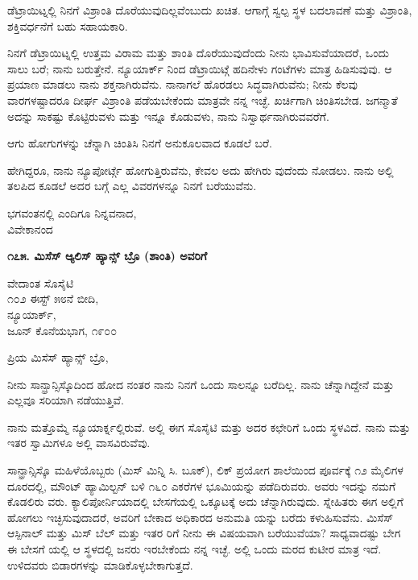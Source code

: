 ಡೆಟ್ರಾಯಿಟ್ನಲ್ಲಿ ನಿನಗೆ ವಿಶ್ರಾಂತಿ ದೊರೆಯುವುದಿಲ್ಲವೆಂಬುದು ಖಚಿತ. ಆಗಾಗ್ಗೆ ಸ್ವಲ್ಪ ಸ್ಥಳ ಬದಲಾವಣೆ ಮತ್ತು ವಿಶ್ರಾಂತಿ, ಶಕ್ತಿವರ್ಧನೆಗೆ ಬಹು ಸಹಾಯಕಾರಿ.

ನಿನಗೆ ಡೆಟ್ರಾಯಿಟ್ನಲ್ಲಿ ಉತ್ತಮ ವಿರಾಮ ಮತ್ತು ಶಾಂತಿ ದೊರೆಯುವುದೆಂದು ನೀನು ಭಾವಿಸುವೆಯಾದರೆ, ಒಂದು ಸಾಲು ಬರೆ; ನಾನು ಬರುತ್ತೇನೆ. ನ್ಯೂಯಾರ್ಕ್ ನಿಂದ ಡೆಟ್ರಾಯಿಟ್ಗೆ ಹದಿನೇಳು ಗಂಟೆಗಳು ಮಾತ್ರ ಹಿಡಿಸುವುವು. ಆ ಪ್ರಯಾಣ ಮಾಡಲು ನಾನು ಶಕ್ತನಾಗಿರುವೆನು. ನಾನಾಗಲೆ ಹೊರಡಲು ಸಿದ್ಧವಾಗಿರುವೆನು; ನೀನು ಕೆಲವು ವಾರಗಳಷ್ಟಾದರೂ ದೀರ್ಘ ವಿಶ್ರಾಂತಿ ಪಡೆಯಬೇಕೆಂದು ಮಾತ್ರವೇ ನನ್ನ ಇಚ್ಛೆ. ಖರ್ಚಿಗಾಗಿ ಚಿಂತಿಸಬೇಡ. ಜಗನ್ಮಾತೆ ಅದನ್ನು ಸಾಕಷ್ಟು ಕೊಟ್ಟಿರುವಳು ಮತ್ತು ಇನ್ನೂ ಕೊಡುವಳು, ನಾನು ನಿಸ್ವಾರ್ಥನಾಗಿರುವವರೆಗೆ.

ಆಗು ಹೋಗುಗಳನ್ನು ಚೆನ್ನಾಗಿ ಚಿಂತಿಸಿ ನಿನಗೆ ಅನುಕೂಲವಾದ ಕೂಡಲೆ ಬರೆ.

ಹೇಗಿದ್ದರೂ, ನಾನು ನ್ಯೂಪೋರ್ಟ್ಗೆ ಹೋಗುತ್ತಿರುವೆನು, ಕೇವಲ ಅದು ಹೇಗಿರು ವುದೆಂದು ನೋಡಲು. ನಾನು ಅಲ್ಲಿ ತಲಪಿದ ಕೂಡಲೆ ಅದರ ಬಗ್ಗೆ ಎಲ್ಲ ವಿವರಗಳನ್ನೂ ನಿನಗೆ ಬರೆಯುವೆನು.

\begin{flushright}
ಭಗವಂತನಲ್ಲಿ ಎಂದಿಗೂ ನಿನ್ನವನಾದ,\\ವಿವೇಕಾನಂದ
\end{flushright}

\begin{center}
\textbf{೧೭೫. ಮಿಸೆಸ್ ಆ್ಯಲಿಸ್ ಹ್ಯಾನ್ಸ್ ಬ್ರೊ (ಶಾಂತಿ) ಅವರಿಗೆ}
\end{center}

\begin{flushright}
ವೇದಾಂತ ಸೊಸೈಟಿ\\೧೦೨ ಈಸ್ಟ್ ೫೮ನೆ ಬೀದಿ,\\ನ್ಯೂಯಾರ್ಕ್,\\ಜೂನ್ ಕೊನೆಯಭಾಗ, ೧೯೦೦
\end{flushright}

ಪ್ರಿಯ ಮಿಸೆಸ್ ಹ್ಯಾನ್ಸ್ ಬ್ರೊ,

ನೀನು ಸಾನ್ಫ್ರಾನ್ಸಿಸ್ಕೊದಿಂದ ಹೋದ ನಂತರ ನಾನು ನಿನಗೆ ಒಂದು ಸಾಲನ್ನೂ ಬರೆದಿಲ್ಲ. ನಾನು ಚೆನ್ನಾಗಿದ್ದೇನೆ ಮತ್ತು ಎಲ್ಲವೂ ಸರಿಯಾಗಿ ನಡೆಯುತ್ತಿವೆ.

ನಾನು ಮತ್ತೊಮ್ಮೆ ನ್ಯೂಯಾರ್ಕ್ನಲ್ಲಿರುವೆ. ಅಲ್ಲಿ ಈಗ ಸೊಸೈಟಿ ಮತ್ತು ಅದರ ಕಛೇರಿಗೆ ಒಂದು ಸ್ಥಳವಿದೆ. ನಾನು ಮತ್ತು ಇತರ ಸ್ವಾಮಿಗಳೂ ಅಲ್ಲಿ ವಾಸವಿರುವೆವು.

ಸಾನ್ಫ್ರಾನ್ಸಿಸ್ಕೊ ಮಹಿಳೆಯೊಬ್ಬರು (ಮಿಸ್ ಮಿನ್ನಿ ಸಿ. ಬೂಕ್), ಲಿಕ್ ಪ್ರಯೋಗ ಶಾಲೆಯಿಂದ ಪೂರ್ವಕ್ಕೆ ೧೨ ಮೈಲಿಗಳ ದೂರದಲ್ಲಿ, ಮೌಂಟ್ ಹ್ಯಾಮಿಲ್ಟನ್ ಬಳಿ ೧೬೦ ಎಕರೆಗಳ ಭೂಮಿಯನ್ನು ಪಡೆದಿರುವರು. ಅವರು ಇದನ್ನು ನಮಗೆ ಕೊಡಲಿರು ವರು. ಕ್ಯಾಲಿಪೋರ್ನಿಯಾದಲ್ಲಿ ಬೇಸಗೆಯಲ್ಲಿ ಒಕ್ಕೂಟಕ್ಕೆ ಅದು ಚೆನ್ನಾಗಿರುವುದು. ಸ್ನೇಹಿತರು ಈಗ ಅಲ್ಲಿಗೆ ಹೋಗಲು ಇಚ್ಛಿಸುವುದಾದರೆ, ಅವರಿಗೆ ಬೇಕಾದ ಅಧಿಕಾರದ ಅನುಮತಿ ಯನ್ನು ಬರೆದು ಕಳುಹಿಸುವೆನು. ಮಿಸೆಸ್ ಆಸ್ಪಿನಾಲ್ ಮತ್ತು ಮಿಸ್ ಬೆಲ್ ಮತ್ತು ಇತರ ರಿಗೆ ನೀನು ಈ ವಿಷಯವಾಗಿ ಬರೆಯುವೆಯಾ? ಸಾಧ್ಯವಾದಷ್ಟು ಬೇಗ ಈ ಬೇಸಗೆ ಯಲ್ಲಿ ಆ ಸ್ಥಳದಲ್ಲಿ ಜನರು ಇರಬೇಕೆಂದು ನನ್ನ ಇಚ್ಛೆ. ಅಲ್ಲಿ ಒಂದು ಮರದ ಕುಟೀರ ಮಾತ್ರ ಇದೆ. ಉಳಿದವರು ಬಿಡಾರಗಳನ್ನು ಮಾಡಿಕೊಳ್ಳಬೇಕಾಗುತ್ತದೆ.


